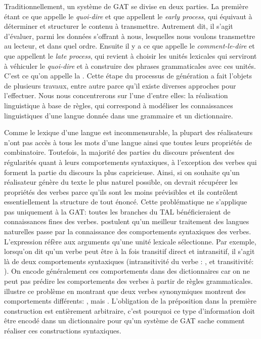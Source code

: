 Traditionnellement, un système de \ac{GAT} se divise en deux parties. La première étant ce que \cite{DanlosPresentationmodelegeneration1983} appelle le \emph{quoi-dire} et que \cite{gatt18} appellent le \emph{early process}, qui équivaut à déterminer et structurer le contenu à transmettre. Autrement dit, il s'agit d'évaluer, parmi les données s'offrant à nous, lesquelles nous voulons transmettre au lecteur, et dans quel ordre. Ensuite il y a ce que \citeauthor{DanlosPresentationmodelegeneration1983} appelle le \emph{comment-le-dire} et que \citeauthor{gatt18} appellent le \emph{late process}, qui revient à choisir les unités lexicales qui serviront à véhiculer le \emph{quoi-dire} et à construire des phrases grammaticales avec ces unités. C'est ce qu'on appelle la . Cette étape du processus de génération a fait l'objets de plusieurs travaux, entre autre parce qu'il existe diverses approches pour l'effectuer. Nous nous concentrerons sur l'une d'entre elles: la réalisation linguistique à base de règles, qui correspond à modéliser les connaissances linguistiques d'une langue donnée dans une grammaire et un dictionnaire.

Comme le lexique d'une langue est incommensurable, la plupart des réalisateurs n'ont pas accès à tous les mots d'une langue ainsi que toutes leurs propriétés de combinatoire. Toutefois, la majorité des parties du discours présentent des régularités quant à leurs comportements syntaxiques, à l'exception des verbes qui forment la partie du discours la plus capricieuse. Ainsi, si on souhaite qu'un réalisateur génère du texte le plus naturel possible, on devrait récupérer les propriétés des verbes parce qu'ils sont les moins prévisibles et ils contrôlent essentiellement la structure de tout énoncé. Cette problématique ne s'applique pas uniquement à la \ac{GAT}: toutes les branches du \ac{TAL} bénéficieraient de connaissances fines des verbes. \cite{Korhonenlargesubcategorizationlexicon2006, SchulerVerbnetBroadcoverageComprehensive2005} postulent qu'un meilleur traitement des langues naturelles passe par la connaissance des comportements syntaxiques des verbes. L'expression  réfère aux arguments qu'une unité lexicale sélectionne. Par exemple, lorsqu'on dit qu'un verbe peut être à la fois transitif direct et intransitif, il s'agit là de deux comportements syntaxiques (intransitivité du verbe : , et transitivité: ). On encode généralement ces comportements dans des dictionnaires car on ne peut pas prédire les comportements des verbes à partir de règles grammaticales. \cite{MilicevicSchemaregimepont2009} illustre ce problème en montrant que deux verbes synonymiques montrent des comportements différents: , mais . L'obligation de la préposition dans la première construction est entièrement arbitraire, c'est pourquoi ce type d'information doit être encodé dans un dictionnaire pour qu'un système de \ac{GAT} sache comment réaliser ces constructions syntaxiques.


